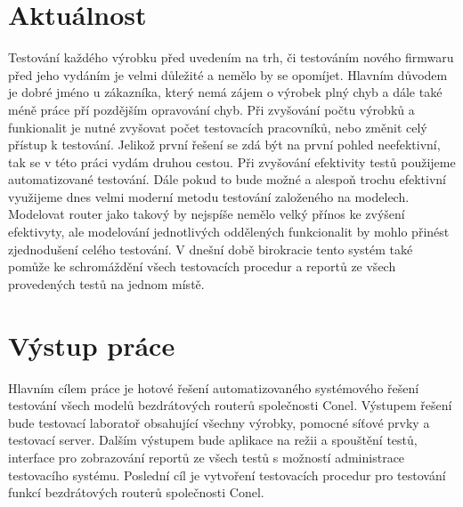 \section{Aktuálnost}
Testování každého výrobku před uvedením na trh, či testováním nového firmwaru před jeho vydáním je velmi důležité a nemělo by se opomíjet. Hlavním důvodem je dobré jméno u zákazníka, který nemá zájem o výrobek plný chyb a dále také méně práce pří pozdějším opravování chyb. Při zvyšování počtu výrobků a funkionalit je nutné zvyšovat počet testovacích pracovníků, nebo změnit celý přístup k testování. Jelikož první řešení se zdá být na první pohled neefektivní, tak se v této práci vydám druhou cestou. Při zvyšování efektivity testů použijeme automatizované testování. Dále pokud to bude možné a alespoň trochu efektivní využijeme dnes velmi moderní metodu testování založeného na modelech. Modelovat router jako takový by nejspíše nemělo velký přínos ke zvýšení efektivyty, ale modelování jednotlivých oddělených funkcionalit by mohlo přinést zjednodušení celého testování. V dnešní době birokracie tento systém také pomůže ke schromáždění všech testovacích procedur a reportů ze všech provedených testů na jednom místě.

\section{Výstup práce}
Hlavním cílem práce je hotové řešení automatizovaného systémového řešení testování všech modelů bezdrátových routerů společnosti Conel. Výstupem  řešení bude testovací laboratoř obsahující všechny výrobky, pomocné síťové prvky a testovací server. Dalším výstupem bude aplikace na režii a spouštění testů, interface pro zobrazování reportů ze všech testů s možností administrace testovacího systému. Poslední cíl je vytvoření testovacích procedur pro testování funkcí bezdrátových routerů společnosti Conel.

